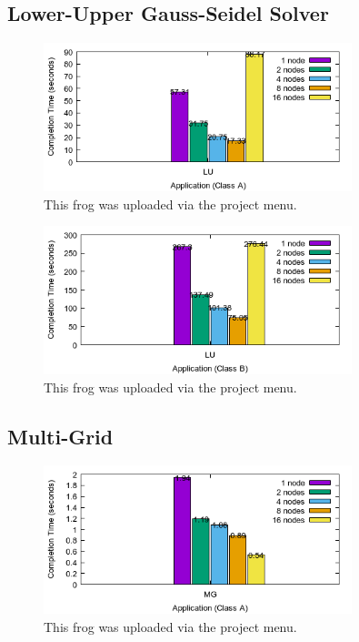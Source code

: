 \documentclass[a4paper]{article}
\begin{document}
\subsection{Lower-Upper Gauss-Seidel Solver}

\begin{figure}[H]
\centering
\includegraphics[width=0.8\textwidth]{figures/LUvA.png}
\caption{\label{fig:LUvA}This frog was uploaded via the project menu.}
\end{figure}

\begin{figure}[H]
\centering
\includegraphics[width=0.8\textwidth]{figures/LUvB.png}
\caption{\label{fig:LUvB}This frog was uploaded via the project menu.}
\end{figure}

\subsection{Multi-Grid}

\begin{figure}[H]
\centering
\includegraphics[width=0.8\textwidth]{figures/MGvA.png}
\caption{\label{fig:MGvA}This frog was uploaded via the project menu.}
\end{figure}
\end{document}
